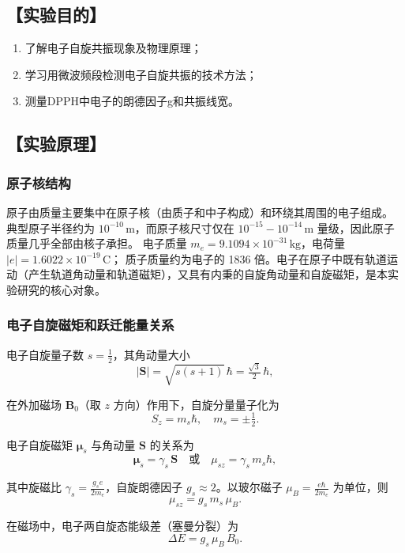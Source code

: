 \documentclass[12pt,a4paper,UTF8]{ctexart}
\begin{document}

\subsection*{【实验目的】}
\begin{enumerate}[(1)]
    \item 了解电子自旋共振现象及物理原理；
    \item 学习用微波频段检测电子自旋共振的技术方法；
    \item 测量DPPH中电子的朗德因子g和共振线宽。
\end{enumerate}

\subsection*{【实验原理】}

\subsubsection*{原子核结构}
原子由质量主要集中在原子核（由质子和中子构成）和环绕其周围的电子组成。
典型原子半径约为 \(10^{-10}\)\,m，而原子核尺寸仅在 \(10^{-15}\!-\!10^{-14}\)\,m 量级，因此原子质量几乎全部由核子承担。
电子质量 \(m_e = 9.1094\times10^{-31}\,\mathrm{kg}\)，电荷量 \(\lvert e\rvert = 1.6022\times10^{-19}\,\mathrm{C}\)；
质子质量约为电子的 1836 倍。电子在原子中既有轨道运动（产生轨道角动量和轨道磁矩），又具有内秉的自旋角动量和自旋磁矩，是本实验研究的核心对象。

\subsubsection*{电子自旋磁矩和跃迁能量关系}
电子自旋量子数 \(s=\tfrac12\)，其角动量大小
\[
|\boldsymbol{S}| = \sqrt{s(s+1)}\,\hbar = \tfrac{\sqrt3}{2}\,\hbar,
\]

在外加磁场 \(\boldsymbol{B}_0\)（取 \(z\) 方向）作用下，自旋分量量子化为
\[
S_z = m_s\hbar,\quad m_s = \pm\tfrac12.
\]

电子自旋磁矩 \(\boldsymbol{\mu}_s\) 与角动量 \(\boldsymbol{S}\) 的关系为
\[
\boldsymbol{\mu}_s = \gamma_s\,\boldsymbol{S}
\quad\text{或}\quad
\mu_{s z} = \gamma_s\,m_s\hbar,
\]

其中旋磁比 \(\displaystyle \gamma_s = \frac{g_s e}{2m_e}\)，自旋朗德因子 \(g_s\approx2\)。以玻尔磁子 \(\mu_B = \frac{e\hbar}{2m_e}\) 为单位，则
\[
\mu_{sz} = g_s\,m_s\,\mu_B.
\]

在磁场中，电子两自旋态能级差（塞曼分裂）为
\[
\Delta E = g_s\,\mu_B\,B_0.
\]
\end{document}
